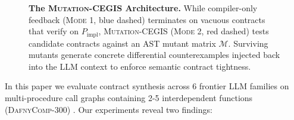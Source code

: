 \documentclass{article}
\begin{document}
\begin{figure}[t]
{%
}
\caption{\textbf{The \textsc{Mutation-CEGIS} Architecture.} While compiler-only feedback (\textsc{Mode 1}, blue dashed) terminates on vacuous contracts that verify on $P_{\text{impl}}$, \textsc{Mutation-CEGIS} (\textsc{Mode 2}, red dashed) tests candidate contracts against an AST mutant matrix $\mathcal{M}$. Surviving mutants generate concrete differential counterexamples injected back into the LLM context to enforce semantic contract tightness.}
\label{fig:pipeline}
\end{figure}
In this paper we evaluate contract synthesis across 6 frontier LLM families on multi-procedure call graphs containing 2-5 interdependent functions (\textsc{DafnyComp-300}) \citep{xu2025dafnycomp}. Our experiments reveal two findings:
\end{document}
